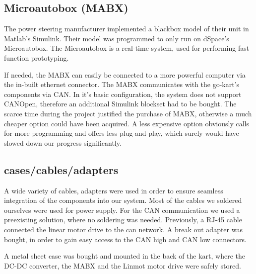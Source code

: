 \subsection{Microautobox (MABX)}
The power steering manufacturer implemented a blackbox model of their unit in Matlab's Simulink. Their model was programmed to only run on dSpace's Microautobox. The Microautobox is a real-time system, used for performing fast function prototyping.

If needed, the MABX can easily be connected to a more powerful computer via the in-built ethernet connector. The MABX communicates with the go-kart's components via CAN. In it's basic configuration, the system does not support CANOpen, therefore an additional Simulink blockset had to be bought. The scarce time during the project justified the purchase of MABX, otherwise a much cheaper option could have been acquired. A less expensive option obviously calls for more programming and offers less plug-and-play, which surely would have slowed down our progress significantly. 

\subsection{cases/cables/adapters}
A wide variety of cables, adapters were used in order to ensure seamless integration of the components into our system.
Most of the cables we soldered ourselves were used for power supply.
For the CAN communication we used a preexisting solution, where no soldering was needed. 
Previously, a RJ-45 cable connected the linear motor drive to the can network. A break out adapter was bought, in order to gain easy access to the CAN high and CAN low connectors.


A metal sheet case was bought and mounted in the back of the kart, where the DC-DC converter, the MABX and the Linmot motor drive were safely stored.